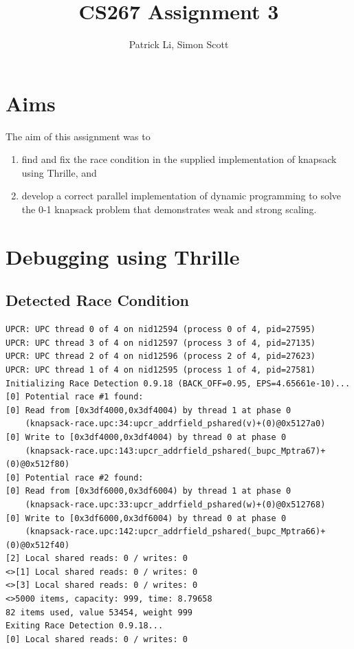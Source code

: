\documentclass[11pt]{article} %
\title{CS267 Assignment 3}
\author{Patrick Li, Simon Scott}
\begin{document}
\maketitle
\parskip 7.2pt

\section{Aims}
The aim of this assignment was to 
\begin{enumerate}
  \item find and fix the race condition in the supplied implementation of knapsack using Thrille, and
  \item develop a correct parallel implementation of dynamic programming to solve the 0-1 knapsack problem that demonstrates weak and strong scaling.
\end{enumerate}

\section{Debugging using Thrille}
\subsection{Detected Race Condition}
{\tiny
\begin{lstlisting}
UPCR: UPC thread 0 of 4 on nid12594 (process 0 of 4, pid=27595)
UPCR: UPC thread 3 of 4 on nid12597 (process 3 of 4, pid=27135)
UPCR: UPC thread 2 of 4 on nid12596 (process 2 of 4, pid=27623)
UPCR: UPC thread 1 of 4 on nid12595 (process 1 of 4, pid=27581)
Initializing Race Detection 0.9.18 (BACK_OFF=0.95, EPS=4.65661e-10)...
[0] Potential race #1 found:
[0] Read from [0x3df4000,0x3df4004) by thread 1 at phase 0 
    (knapsack-race.upc:34:upcr_addrfield_pshared(v)+(0)@0x5127a0)
[0] Write to [0x3df4000,0x3df4004) by thread 0 at phase 0 
    (knapsack-race.upc:143:upcr_addrfield_pshared(_bupc_Mptra67)+(0)@0x512f80)
[0] Potential race #2 found:
[0] Read from [0x3df6000,0x3df6004) by thread 1 at phase 0 
    (knapsack-race.upc:33:upcr_addrfield_pshared(w)+(0)@0x512768)
[0] Write to [0x3df6000,0x3df6004) by thread 0 at phase 0 
    (knapsack-race.upc:142:upcr_addrfield_pshared(_bupc_Mptra66)+(0)@0x512f40)
[2] Local shared reads: 0 / writes: 0
<>[1] Local shared reads: 0 / writes: 0
<>[3] Local shared reads: 0 / writes: 0
<>5000 items, capacity: 999, time: 8.79658
82 items used, value 53454, weight 999
Exiting Race Detection 0.9.18...
[0] Local shared reads: 0 / writes: 0
\end{lstlisting}
}
\end{document}
